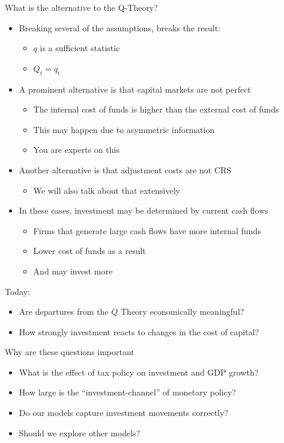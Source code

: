 \documentclass[11pt,aspectratio=169,xcolor={dvipsnames},hyperref={pdftex,pdfpagemode=UseNone,hidelinks,pdfdisplaydoctitle=true},usepdftitle=false]{beamer}
\begin{document}
\begin{frame}{What is the alternative to the Q-Theory?}
\begin{itemize}
\item Breaking several of the assumptions, breaks the result:
\pause
\begin{itemize}
\item $q$ is a sufficient statistic
\item  $Q_t = q_t$
\end{itemize}
\pause
\item A prominent alternative is that capital markets are not perfect
\pause
\begin{itemize}
\item The internal cost of funds is higher than the external cost of funds
\pause
\item This may happen due to asymmetric information
\pause
\item You are experts on this
\end{itemize}
\pause
\item Another alternative is that adjustment costs are not CRS
\begin{itemize}
\item We will also talk about that extensively
\end{itemize}
\pause
\item In these cases, investment may be determined by current cash flows
\begin{itemize}
\item Firms that generate large cash flows have more internal funds
\item Lower cost of funds as a result
\item And may invest more
\end{itemize}
\end{itemize}
\end{frame}


\begin{frame}
Today:
\begin{itemize}
\item Are departures from the $Q$ Theory economically meaningful?
\pause
\item How strongly investment reacts to changes in the cost of capital?
\end{itemize}
\end{frame}

\begin{frame}{Why are these questions important}
\begin{itemize}
\item What is the effect of tax policy on investment and GDP growth?
\pause
\item How large is the ``investment-channel'' of monetary policy?
\pause
\item Do our models capture investment movements correctly?
\pause
\item Should we explore other models?
\pause
\end{itemize}
\end{frame}
\end{document}
